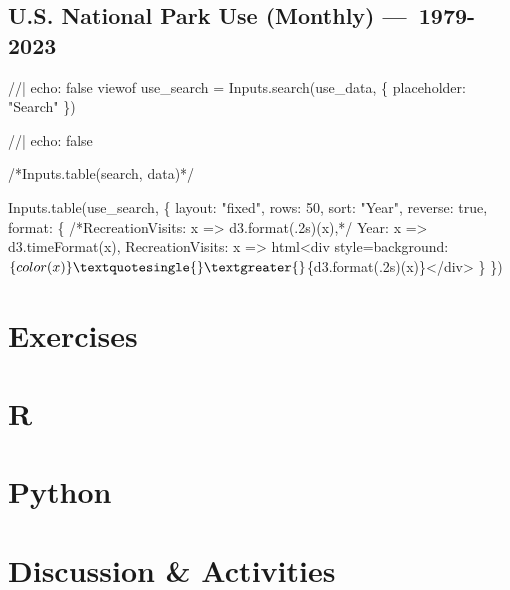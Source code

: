 \documentclass[
  letterpaper,
  DIV=11,
  numbers=noendperiod]{scrartcl}
\newenvironment{Shaded}{\begin{snugshade}}{\end{snugshade}}
\newcommand{\NormalTok}[1]{\textcolor[rgb]{0.00,0.23,0.31}{#1}}
\begin{document}
\subsection{U.S. National Park Use (Monthly)
---~1979-2023}\label{u.s.-national-park-use-monthly-1979-2023}

\begin{Shaded}
\begin{Highlighting}[]
\NormalTok{//| echo: false}
\NormalTok{viewof use\_search = Inputs.search(use\_data, \{}
\NormalTok{  placeholder: "Search"}
\NormalTok{\})}
\end{Highlighting}
\end{Shaded}

\begin{Shaded}
\begin{Highlighting}[]
\NormalTok{//| echo: false}

\NormalTok{/*Inputs.table(search, data)*/}

\NormalTok{Inputs.table(use\_search, \{}
\NormalTok{  layout: "fixed",}
\NormalTok{  rows: 50,}
\NormalTok{  sort: "Year",}
\NormalTok{  reverse: true,}
\NormalTok{  format: \{}
\NormalTok{    /*RecreationVisits: x =\textgreater{} d3.format(\textquotesingle{}.2s\textquotesingle{})(x),*/}
\NormalTok{    Year: x =\textgreater{} d3.timeFormat(x),}
\NormalTok{    RecreationVisits: x =\textgreater{} html\textasciigrave{}\textless{}div style=\textquotesingle{}background:$\{color(x)\}\textquotesingle{}\textgreater{}$\{d3.format(\textquotesingle{}.2s\textquotesingle{})(x)\}\textless{}/div\textgreater{}\textasciigrave{}}
\NormalTok{  \}}
\NormalTok{\})}
\end{Highlighting}
\end{Shaded}

\section{Exercises}\label{exercises}

\section{R}

\label{exercise-posts}

\section{Python}

\section{Discussion \& Activities}\label{discussion-and-activities}
\end{document}
